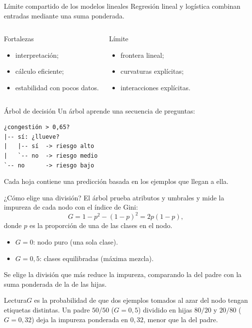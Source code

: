 \documentclass[aspectratio=169,10pt]{beamer}
\begin{document}
\begin{frame}{Límite compartido de los modelos lineales}
  \small
  Regresión lineal y logística combinan entradas mediante una suma ponderada.
  \begin{columns}[T]
    \begin{block}{Fortalezas}\begin{itemize}\item interpretación;\item cálculo eficiente;\item estabilidad con pocos datos.\end{itemize}\end{block}
    \begin{alertblock}{Límite}\begin{itemize}\item frontera lineal;\item curvaturas explícitas;\item interacciones explícitas.\end{itemize}\end{alertblock}
  \end{columns}
\end{frame}

\begin{frame}[fragile]{Árbol de decisión}
  \small Un árbol aprende una secuencia de preguntas:
\begin{verbatim}
¿congestión > 0,65?
|-- sí: ¿llueve?
|   |-- sí  -> riesgo alto
|   `-- no  -> riesgo medio
`-- no      -> riesgo bajo
\end{verbatim}
  Cada hoja contiene una predicción basada en los ejemplos que llegan a ella.
\end{frame}

\begin{frame}{¿Cómo elige una división?}
  \small
  El árbol prueba atributos y umbrales y mide la impureza de cada nodo con el índice de Gini:
  \[G=1-p^2-(1-p)^2=2p(1-p),\]
  donde $p$ es la proporción de una de las clases en el nodo.
  \begin{itemize}
    \item $G=0$: nodo puro (una sola clase).
    \item $G=0{,}5$: clases equilibradas (máxima mezcla).
  \end{itemize}
  Se elige la división que más reduce la impureza, comparando la del padre con la suma ponderada de la de las hijas.
  \begin{block}{Lectura}$G$ es la probabilidad de que dos ejemplos tomados al azar del nodo tengan etiquetas distintas. Un padre $50/50$ ($G=0{,}5$) dividido en hijas $80/20$ y $20/80$ ($G=0{,}32$) deja la impureza ponderada en $0{,}32$, menor que la del padre.\end{block}
\end{frame}
\end{document}
